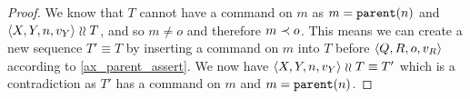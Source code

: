 \begin{proof}
We know that $T$ cannot have a command on $m$ as $m=\mathtt{parent}(n)$ and $\langle{X,Y,n,v_Y}\rangle\mathrel{\wr\wr} T$,
and so $m\neq o$ and therefore $m\prec o$.
This means we can create a new sequence $T'\equiv T$ by inserting a command on 
$m$ into $T$ before $\langle{Q,R,o,v_R}\rangle$
according to \cref{ax_parent_assert}.
We now have $\langle{X,Y,n,v_Y}\rangle\mathrel{\wr\wr} T\equiv T'$ which is a contradiction as
$T'$ has a command on $m$ and $m=\mathtt{parent}(n)$.
\end{proof}
